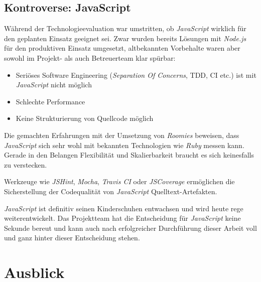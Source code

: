 \subsection*{Kontroverse: JavaScript}

Während der Technologieevaluation war umstritten, ob \emph{JavaScript} wirklich für den geplanten Einsatz geeignet sei. Zwar wurden bereits Lösungen mit \emph{Node.js} für den produktiven Einsatz umgesetzt, altbekannten Vorbehalte waren aber sowohl im Projekt- als auch Betreuerteam klar spürbar:

\begin{itemize}
	\item Seriöses Software Engineering (\emph{Separation Of Concerns}, \gls{TDD}, CI etc.) ist mit \emph{JavaScript} nicht möglich
	\item Schlechte Performance
	\item Keine Strukturierung von Quellcode möglich
\end{itemize}

Die gemachten Erfahrungen mit der Umsetzung von \emph{Roomies} beweisen, dass \emph{JavaScript} sich sehr wohl mit bekannten Technologien wie \emph{Ruby} messen kann. Gerade in den Belangen Flexibilität und Skalierbarkeit braucht es sich keinesfalls zu verstecken.

Werkzeuge wie \emph{JSHint}, \emph{Mocha}, \emph{Travis CI} oder \emph{JSCoverage} ermöglichen die Sicherstellung der Codequalität von \emph{JavaScript} Quelltext-Artefakten.

\emph{JavaScript} ist definitiv seinen Kinderschuhen entwachsen und wird heute rege weiterentwickelt. Das Projektteam hat die Entscheidung für \emph{JavaScript} keine Sekunde bereut und kann auch nach erfolgreicher Durchführung dieser Arbeit voll und ganz hinter dieser Entscheidung stehen.



\section*{Ausblick}


